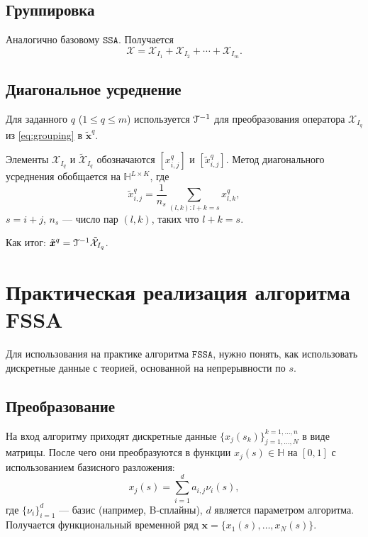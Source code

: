 \documentclass[12pt, specialist, subf
]{disser}
\theoremstyle{definition}
\newcommand{\SSA}{\texttt{SSA}}
\newcommand{\FSSA}{\texttt{FSSA}}
\begin{document}
\subsection*{Группировка}

Аналогично базовому $\SSA$. Получается
\begin{equation}\label{eq:grouping}
	\mathcal{X}=\mathcal{X}_{I_1}+\mathcal{X}_{I_2}+\cdots+\mathcal{X}_{I_m}.
\end{equation}


\subsection*{Диагональное усреднение}

Для заданного $q$ ($1\leq q\leq m$) используется $\EuScript{T}^{-1}$ для преобразования оператора $\mathcal{X}_{I_q}$ из \eqref{eq:grouping} в $\tilde{\pmb x}^q$.


Элементы $\mathcal{X}_{I_q}$ и $\tilde{\mathcal{X}}_{I_q}$ обозначаются $[x_{i,j}^{q}]$ и $[\tilde{x}_{i,j}^{q}]$. Метод диагонального усреднения  обобщается на $\mathbb{H}^{L\times K}$, где
\begin{equation}\label{fdiag-ave}
	\tilde{x}_{i,j}^{q}=\frac{1}{n_s}\sum_{(l,k): l+k=s} x_{l,k}^q,
\end{equation}
$s=i+j$, $n_s$ — число пар $(l,k)$, таких что $l+k=s$. 

Как итог: $\tilde{\pmb x}^q=\EuScript{T}^{-1}\tilde{\mathcal{X}}_{I_q}$.


\section{Практическая реализация алгоритма FSSA}

Для использования на практике алгоритма $\FSSA$, нужно понять, как использовать дискретные данные с теорией, основанной на непрерывности по $s$. 

\subsection*{Преобразование}

На вход алгоритму приходят 
дискретные данные \( \{x_j(s_k)\}_{j=1,\dots,N}^{ k = 1, \dots, n} \)  в виде матрицы. После чего они преобразуются в функции \( x_j(s) \in \mathbb{H} \) на \( [0,1] \) с использованием базисного разложения:
\[
	x_j(s) = \sum_{i=1}^d a_{i,j} \nu_i(s),
\]
где \( \{\nu_i\}_{i=1}^d \) — базис (например, B-сплайны), \( d \) является параметром алгоритма. Получается функциональный временной ряд \( \pmb {x} = \{x_1(s), \dots, x_N(s)\} \).
\end{document}

